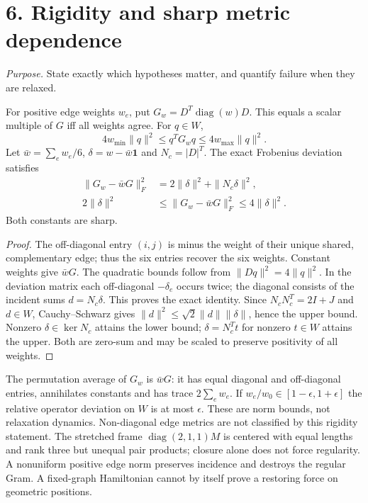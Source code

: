 \section*{6. Rigidity and sharp metric dependence}
\textit{Purpose.} State exactly which hypotheses matter, and quantify failure when they are relaxed.

\begin{theorem}\label{thm:rigidity}
For positive edge weights $w_e$, put $G_w=D^T\operatorname{diag}(w)D$. This equals a scalar multiple of $G$ iff all weights agree. For $q\in W$,
\begin{equation}
 4w_{\min}\|q\|^2\leq q^TG_wq\leq4w_{\max}\|q\|^2.
\end{equation}
Let $\bar w=\sum_e w_e/6$, $\delta=w-\bar w\mathbf1$ and $N_c=|D|^T$. The exact Frobenius deviation satisfies
\begin{align}
 \|G_w-\bar wG\|_F^2&=2\|\delta\|^2+\|N_c\delta\|^2,\\
 2\|\delta\|^2&\leq\|G_w-\bar wG\|_F^2\leq4\|\delta\|^2.\label{eq:sharp}
\end{align}
Both constants are sharp.
\end{theorem}
\begin{proof}
The off-diagonal entry $(i,j)$ is minus the weight of their unique shared, complementary edge; thus the six entries recover the six weights. Constant weights give $\bar wG$. The quadratic bounds follow from $\|Dq\|^2=4\|q\|^2$. In the deviation matrix each off-diagonal $-\delta_e$ occurs twice; the diagonal consists of the incident sums $d=N_c\delta$. This proves the exact identity. Since $N_cN_c^T=2I+J$ and $d\in W$, Cauchy--Schwarz gives $\|d\|^2\leq\sqrt2\|d\|\|\delta\|$, hence the upper bound. Nonzero $\delta\in\ker N_c$ attains the lower bound; $\delta=N_c^Tt$ for nonzero $t\in W$ attains the upper. Both are zero-sum and may be scaled to preserve positivity of all weights.
\end{proof}
The permutation average of $G_w$ is $\bar wG$: it has equal diagonal and off-diagonal entries, annihilates constants and has trace $2\sum_e w_e$. If $w_e/w_0\in[1-\epsilon,1+\epsilon]$ the relative operator deviation on $W$ is at most $\epsilon$. These are norm bounds, not relaxation dynamics. Non-diagonal edge metrics are not classified by this rigidity statement. The stretched frame $\operatorname{diag}(2,1,1)M$ is centered with equal lengths and rank three but unequal pair products; closure alone does not force regularity. A nonuniform positive edge norm preserves incidence and destroys the regular Gram. A fixed-graph Hamiltonian cannot by itself prove a restoring force on geometric positions.

